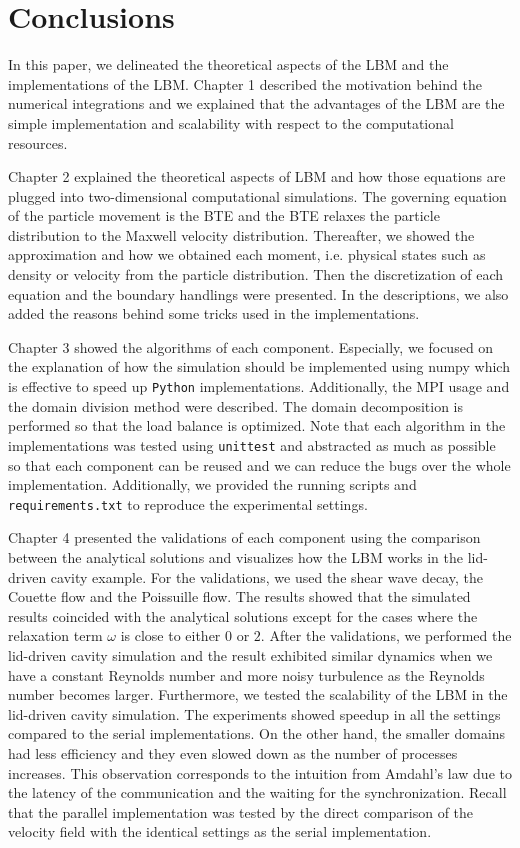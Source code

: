 \chapter{Conclusions}
\vspace{-8mm}
In this paper,
we delineated the theoretical aspects of the LBM
and the implementations of the LBM.
Chapter 1 described the motivation behind the numerical integrations
and 
we explained that the advantages of the LBM
are the simple implementation
and scalability with respect to the computational
resources.

Chapter 2 explained the theoretical aspects of LBM
and how those equations are plugged into two-dimensional
computational simulations.
The governing equation of the particle movement is
the BTE and the BTE relaxes the particle distribution
to the Maxwell velocity distribution.
Thereafter, we showed the approximation and how we obtained each moment, i.e.
physical states such as density or velocity
from the particle distribution.
Then the discretization of each equation and
the boundary handlings were presented.
In the descriptions, we also added the
reasons behind some tricks used in the implementations.

Chapter 3 showed the algorithms of each component.
Especially, we focused on the explanation of how
the simulation should be implemented using numpy
which is effective to speed up {\tt Python} implementations.
Additionally, the MPI usage and the domain division method
were described.
The domain decomposition is performed so that the 
load balance is optimized.
Note that each algorithm in the implementations
was tested using {\tt unittest} and abstracted as much as possible
so that each component can be reused and we can reduce
the bugs over the whole implementation.
Additionally, we provided the running scripts and {\tt requirements.txt}
to reproduce the experimental settings.

Chapter 4 presented the validations of each component
using the comparison between the analytical solutions
and visualizes how the LBM works in the lid-driven cavity
example.
For the validations, we used the shear wave decay, 
the Couette flow and the Poissuille flow.
The results showed that the simulated results
coincided with the analytical solutions except for
the cases where the relaxation term $\omega$ is 
close to either $0$ or $2$.
After the validations, we performed the lid-driven cavity simulation
and the result exhibited similar dynamics when we have a constant Reynolds number
and more noisy turbulence as the Reynolds number becomes larger.
Furthermore, we tested the scalability of the LBM in the lid-driven cavity simulation.
The experiments showed speedup in all the settings compared to
the serial implementations.
On the other hand, the smaller domains had
less efficiency and they even slowed down as the number of processes increases.
This observation corresponds to the intuition from Amdahl's law due to
the latency of the communication and the waiting for the synchronization.
Recall that the parallel implementation was tested by the direct
comparison of the velocity field with the identical settings
as the serial implementation. 
